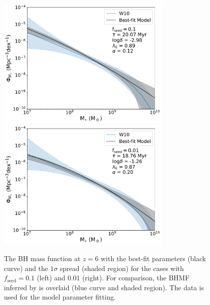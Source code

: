 \documentclass[twocolumn, twocolappendix]{aastex63}
\newcommand{\fseed}{f_\mathrm{seed}}
\begin{document}
\begin{CJK*}{UTF8}{gbsn}
\begin{figure}
\centering
\includegraphics[width=85mm]{f1ndraw60MF_spread.pdf}\hspace{3mm}
\includegraphics[width=85mm]{f2ndraw60MF_spread.pdf}
\caption{
The BH mass function at $z=6$ with the best-fit parameters (black curve) and the $1\sigma$ spread (shaded region) for the cases with $\fseed=0.1$ (left) and $0.01$ (right). 
For comparison, the BHMF inferred by  is overlaid (blue curve and shaded region).
The data is used for the model parameter fitting.
}
\label{fig:fitmf}
\end{figure}



\end{CJK*}
\end{document}
